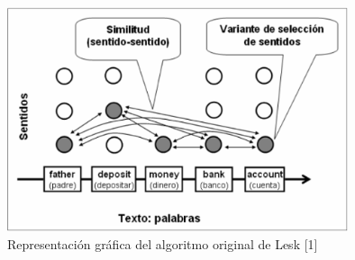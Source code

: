   \begin{figure}[h!]
    \begin{center}
    \includegraphics[angle=0, width=10cm]{Graficos/algoritmo_lesk}
    \caption{Representación gráfica del algoritmo original de Lesk [1]}
    \end{center}
  \end{figure}

